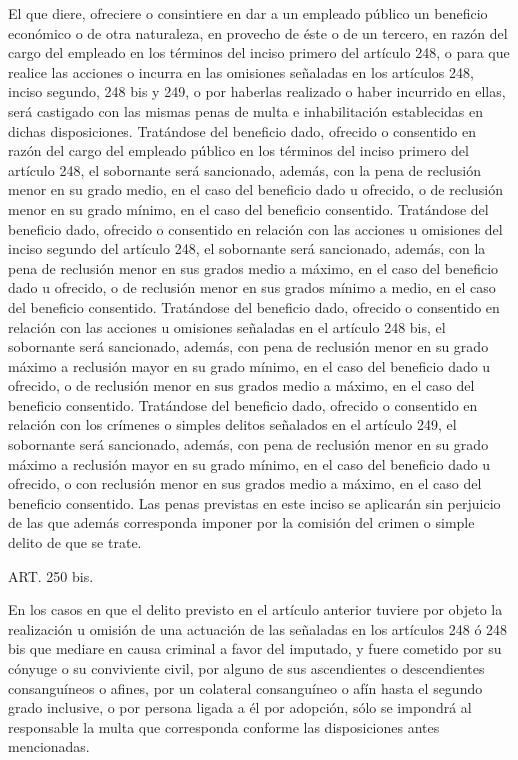     El que diere, ofreciere o consintiere en dar a un empleado público un beneficio económico o de otra naturaleza, en provecho de éste o de un tercero, en razón del cargo del empleado en los términos del inciso primero del artículo 248, o para que realice las acciones o incurra en las omisiones señaladas en los artículos 248, inciso segundo, 248 bis y 249, o por haberlas realizado o haber incurrido en ellas, será castigado con las mismas penas de multa e inhabilitación establecidas en dichas disposiciones.
    Tratándose del beneficio dado, ofrecido o consentido en razón del cargo del empleado público en los términos del inciso primero del artículo 248, el sobornante será sancionado, además, con la pena de reclusión menor en su grado medio, en el caso del beneficio dado u ofrecido, o de reclusión menor en su grado mínimo, en el caso del beneficio consentido.
    Tratándose del beneficio dado, ofrecido o consentido en relación con las acciones u omisiones del inciso segundo del artículo 248, el sobornante será sancionado, además, con la pena de reclusión menor en sus grados medio a máximo, en el caso del beneficio dado u ofrecido, o de reclusión menor en sus grados mínimo a medio, en el caso del beneficio consentido.
    Tratándose del beneficio dado, ofrecido o consentido en relación con las acciones u omisiones señaladas en el artículo 248 bis, el sobornante será sancionado, además, con pena de reclusión menor en su grado máximo a reclusión mayor en su grado mínimo, en el caso del beneficio dado u ofrecido, o de reclusión menor en sus grados medio a máximo, en el caso del beneficio consentido.
    Tratándose del beneficio dado, ofrecido o consentido en relación con los crímenes o simples delitos señalados en el artículo 249, el sobornante será sancionado, además, con pena de reclusión menor en su grado máximo a reclusión mayor en su grado mínimo, en el caso del beneficio dado u ofrecido, o con reclusión menor en sus grados medio a máximo, en el caso del beneficio consentido. Las penas previstas en este inciso se aplicarán sin perjuicio de las que además corresponda imponer por la comisión del crimen o simple delito de que se trate.




    ART. 250 bis.

    En los casos en que el delito previsto en el artículo anterior tuviere por objeto la realización u omisión de una actuación de las señaladas en los artículos 248 ó 248 bis que mediare en causa criminal a favor del imputado, y fuere cometido por su cónyuge o su conviviente civil, por alguno de sus ascendientes o descendientes consanguíneos o afines, por un colateral consanguíneo o afín hasta el segundo grado inclusive, o por persona ligada a él por adopción, sólo se impondrá al responsable la multa que corresponda conforme las disposiciones antes mencionadas.



